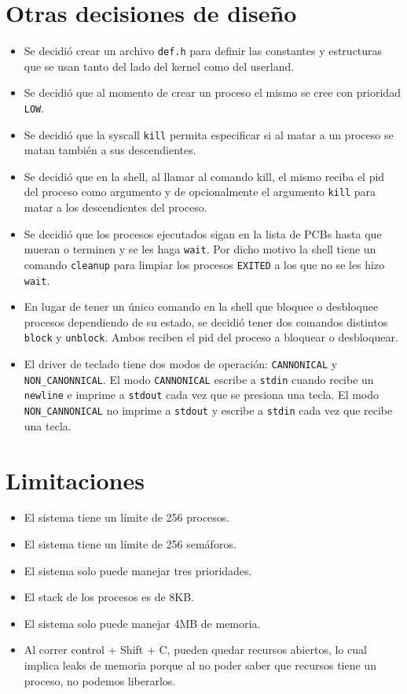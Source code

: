\documentclass{article}
\begin{document}
\section {Otras decisiones de diseño}
\begin{itemize}
    \item Se decidió crear un archivo \texttt{\texttt{def.h}} para definir las constantes y estructuras que se usan tanto del lado del kernel como del userland.
    \item Se decidió que al momento de crear un proceso el mismo se cree con prioridad \texttt{LOW}.
    \item Se decidió que la syscall \texttt{kill} permita especificar si al matar a un proceso se matan también a sus descendientes.
    \item Se decidió que en la shell, al llamar al comando kill, el mismo reciba el pid del proceso como argumento y de opcionalmente el argumento \texttt{kill} para matar a los descendientes del proceso.
    \item Se decidió que los procesos ejecutados sigan en la lista de PCBs hasta que mueran o terminen y se les haga \texttt{wait}. Por dicho motivo la shell tiene un comando \texttt{cleanup} para limpiar los procesos \texttt{EXITED} a los que no se les hizo \texttt{wait}.\item En lugar de tener un único comando en la shell que bloquee o desbloquee procesos dependiendo de su estado, se decidió tener dos comandos distintos \texttt{block} y \texttt{unblock}. Ambos reciben el pid del proceso a bloquear o desbloquear.
    \item El driver de teclado tiene dos modos de operación: \texttt{CANNONICAL} y \texttt{NON\_CANONNICAL}. El modo \texttt{CANNONICAL} escribe a \texttt{stdin} cuando recibe un \texttt{newline} e imprime a \texttt{stdout} cada vez que se presiona una tecla. El modo \texttt{NON\_CANNONICAL} no imprime a \texttt{stdout} y escribe a \texttt{stdin} cada vez que recibe una tecla.
\end{itemize}

\section {Limitaciones}
\begin{itemize}
    \item El sistema tiene un límite de 256 procesos.
    \item El sistema tiene un límite de 256 semáforos.
    \item El sistema solo puede manejar tres prioridades.
    \item El stack de los procesos es de 8KB.
    \item El sistema solo puede manejar 4MB de memoria.
    \item Al correr control + Shift + C, pueden quedar recursos abiertos, lo cual implica leaks de memoria porque al no poder saber que recursos tiene un proceso, no podemos liberarlos.
\end{itemize}
\end{document}
